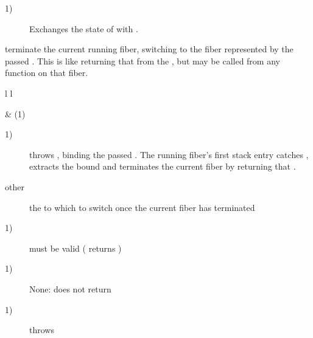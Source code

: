 \begin{description}
    \item[1)] Exchanges the state of  with .\\
\end{description}



terminate the current running fiber, switching to the fiber represented by
the passed \fiber. This is like returning that \fiber from the \entryfn, but may
be called from any function on that fiber.

\begin{tabular}{ l l }
    \midrule

     & (1)\\

    \midrule
\end{tabular}

\begin{description}
    \item[1)] throws \unwindex, binding the passed \fiber. The running fiber's
              first stack entry catches \unwindex, extracts the bound \fiber
              and terminates the current fiber by returning that \fiber.
\end{description}

\begin{description}
    \item[other] the \fiber to which to switch once the current fiber has terminated
\end{description}

\begin{description}
    \item[1)]  must be valid ( returns )
\end{description}

\begin{description}
    \item[1)] None: \unwindfib does not return
\end{description}

\begin{description}
    \item[1)] throws \unwindex
\end{description}



